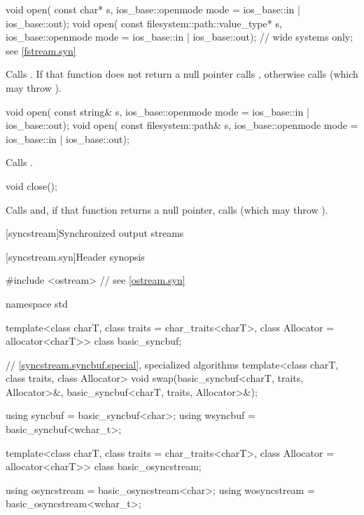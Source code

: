 %
\begin{itemdecl}
void open(
  const char* s,
  ios_base::openmode mode = ios_base::in | ios_base::out);
void open(
  const filesystem::path::value_type* s,
  ios_base::openmode mode = ios_base::in | ios_base::out);  // wide systems only; see \ref{fstream.syn}
\end{itemdecl}

\begin{itemdescr}
\pnum
\effects
Calls
.
If that function does not return a null pointer calls ,
otherwise calls
(which may throw
).
\end{itemdescr}

%
\begin{itemdecl}
void open(
  const string& s,
  ios_base::openmode mode = ios_base::in | ios_base::out);
void open(
  const filesystem::path& s,
  ios_base::openmode mode = ios_base::in | ios_base::out);
\end{itemdecl}

\begin{itemdescr}
\pnum
\effects
Calls .
\end{itemdescr}

%
\begin{itemdecl}
void close();
\end{itemdecl}

\begin{itemdescr}
\pnum
\effects
Calls
and, if that function
returns a null pointer,
calls
(which may throw
).
\end{itemdescr}

[syncstream]{Synchronized output streams}

[syncstream.syn]{Header  synopsis}

%
%
%
%
%
\begin{codeblock}
#include <ostream>  // see \ref{ostream.syn}

namespace std {
  template<class charT, class traits = char_traits<charT>, class Allocator = allocator<charT>>
    class basic_syncbuf;

  // \ref{syncstream.syncbuf.special}, specialized algorithms
  template<class charT, class traits, class Allocator>
    void swap(basic_syncbuf<charT, traits, Allocator>&,
              basic_syncbuf<charT, traits, Allocator>&);

  using syncbuf = basic_syncbuf<char>;
  using wsyncbuf = basic_syncbuf<wchar_t>;

  template<class charT, class traits = char_traits<charT>, class Allocator = allocator<charT>>
    class basic_osyncstream;

  using osyncstream = basic_osyncstream<char>;
  using wosyncstream = basic_osyncstream<wchar_t>;
}
\end{codeblock}

